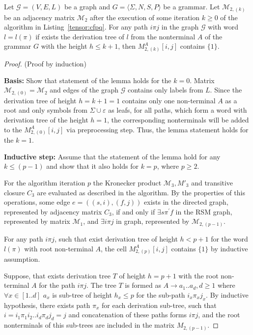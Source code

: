 \begin{lemma}
    \label{lemma:algo:completeness}
    Let $\mathcal{G} = (V,E,L)$ be a graph and $G = \langle\Sigma, N, S, P\rangle$ be a grammar. 
    Let $\mathcal{M}_{2,(k)}$ be an adjacency matrix $\mathcal{M}_2$ after the execution of some iteration $k \geq 0$ of the algorithm in Listing~\ref{tensor:cfpq}.
    For any path $i \pi j$ in the graph $\mathcal{G}$ with word $l = l(\pi)$ if 
    exists the derivation tree of $l$ from the nonterminal $A$ of the grammar $G$ with the height $h \leq k+1$, then $M_{2,(k)}^A[i,j]$ contains $\{1\}$.

\end{lemma}

\begin{proof}{(Proof by induction)}

    \textbf{Basis:} Show that statement of the lemma holds for the $k = 0$. Matrix
    $\mathcal{M}_{2,(0)} = \mathcal{M}_2$ and edges of the graph $\mathcal{G}$ contains only labels from $L$. 
    Since the derivation tree of height $h = k + 1 = 1$ contains only one non-terminal 
    $A$ as a root and only symbols from $\Sigma \cup {\varepsilon}$ as leafs, 
    for all paths, which form a word with derivation tree of the height $h = 1$, 
    the corresponding nonterminals will be added to the $M_{2,(0)}^A[i,j]$ via preprocessing step. Thus, the lemma statement holds for the $k = 1$.

    \textbf{Inductive step:} Assume that the statement of the lemma hold for any
    $k \leq (p - 1)$ and show that it also holds for $k = p$, where $p \geq 2$.
    
    For the algorithm iteration $p$ the Kronecker product $\mathcal{M}_3, M'_3$ and transitive
    closure $C_3$ are evaluated as described in the algorithm. By the properties
    of this operations, some edge $e = ((s,i),(f,j))$ exists in the directed
    graph, represented by adjacency matrix $C_3$, if and only if $\exists s
    \pi^{'} f$ in the RSM graph, represented by matrix $\mathcal{M}_1$, and 
    $\exists i \pi j$ in graph, represented by $\mathcal{M}_{2,(p-1)}$. 
    
    For any path $i \pi j$, such that exist derivation tree of height $h < p + 1$ 
    for the word $l(\pi)$ with root non-terminal $A$, the cell $M_{2,(p)}^A[i,j]$ contains $\{1\}$ by inductive assumption.
    
    Suppose, that exists derivation tree $T$ of height $h = p + 1$ with the root 
    non-terminal $A$ for the path $i \pi j$. The tree $T$ is formed as
    $A \to a_1 .. a_d, d \geq 1$ where $\forall x \in [1..d]$ $a_x$ is sub-tree of
    height $h_x \leq p$ for the sub-path $i_x \pi_x j_x$. 
    By inductive hypothesis, there exists path $\pi_x$ for each derivation sub-tree, 
    such that $i = i_1 \pi_1 i_2 .. i_{d} \pi_{d} j_{d} = j$ and concatenation 
    of these paths forms $i \pi j$, and the root nonterminals of 
    this sub-trees are included in the matrix $M_{2, (p - 1)}$. 
    

\end{proof}
